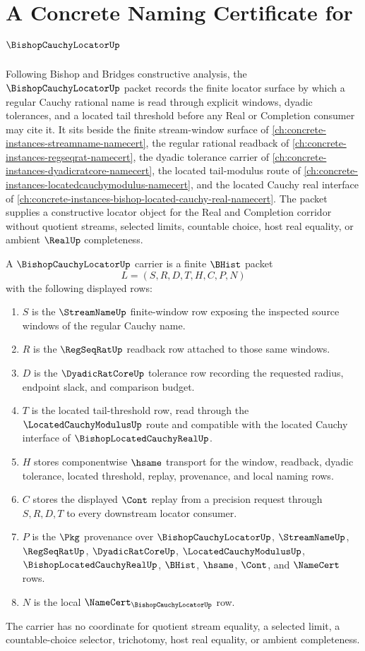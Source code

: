 \chapter{A Concrete Naming Certificate for $\BishopCauchyLocatorUp$}
\label{ch:concrete-instances-bishop-cauchy-locator-namecert}

Following Bishop and Bridges constructive analysis, the $\BishopCauchyLocatorUp$ packet records the finite locator surface by which a regular Cauchy rational name is read through explicit windows, dyadic tolerances, and a located tail threshold before any Real or Completion consumer may cite it. It sits beside the finite stream-window surface of \autoref{ch:concrete-instances-streamname-namecert}, the regular rational readback of \autoref{ch:concrete-instances-regseqrat-namecert}, the dyadic tolerance carrier of \autoref{ch:concrete-instances-dyadicratcore-namecert}, the located tail-modulus route of \autoref{ch:concrete-instances-locatedcauchymodulus-namecert}, and the located Cauchy real interface of \autoref{ch:concrete-instances-bishop-located-cauchy-real-namecert}. The packet supplies a constructive locator object for the Real and Completion corridor without quotient streams, selected limits, countable choice, host real equality, or ambient $\RealUp$ completeness.

\begin{definition}
\label{def:bishop-cauchy-locator-carrier}
A $\BishopCauchyLocatorUp$ carrier is a finite $\BHist$ packet
$$
L=(S,R,D,T,H,C,P,N)
$$
with the following displayed rows:
\begin{enumerate}
\item $S$ is the $\StreamNameUp$ finite-window row exposing the inspected source windows of the regular Cauchy name.
\item $R$ is the $\RegSeqRatUp$ readback row attached to those same windows.
\item $D$ is the $\DyadicRatCoreUp$ tolerance row recording the requested radius, endpoint slack, and comparison budget.
\item $T$ is the located tail-threshold row, read through the $\LocatedCauchyModulusUp$ route and compatible with the located Cauchy interface of $\BishopLocatedCauchyRealUp$.
\item $H$ stores componentwise $\hsame$ transport for the window, readback, dyadic tolerance, located threshold, replay, provenance, and local naming rows.
\item $C$ stores the displayed $\Cont$ replay from a precision request through $S,R,D,T$ to every downstream locator consumer.
\item $P$ is the $\Pkg$ provenance over $\BishopCauchyLocatorUp$, $\StreamNameUp$, $\RegSeqRatUp$, $\DyadicRatCoreUp$, $\LocatedCauchyModulusUp$, $\BishopLocatedCauchyRealUp$, $\BHist$, $\hsame$, $\Cont$, and $\NameCert$ rows.
\item $N$ is the local $\NameCert_{\BishopCauchyLocatorUp}$ row.
\end{enumerate}
The carrier has no coordinate for quotient stream equality, a selected limit, a countable-choice selector, trichotomy, host real equality, or ambient completeness.
\end{definition}

